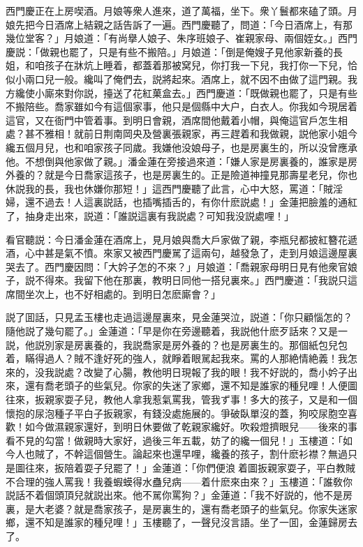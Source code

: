 西門慶正在上房喫酒。月娘等衆人進來，道了萬福，坐下。衆丫鬟都來磕了頭。月娘先把今日酒席上結親之話告訴了一遍。西門慶聽了，問道：「今日酒席上，有那幾位堂客？」月娘道：「有尚擧人娘子、朱序班娘子、崔親家母、兩個姪女。」西門慶説：「做親也罷了，只是有些不搬陪。」月娘道：「倒是俺嫂子見他家新養的長姐，和咱孩子在牀炕上睡着，都蓋着那被窝兒，你打我一下兒，我打你一下兒，恰似小兩口兒一般。纔叫了俺們去，説將起來。酒席上，就不因不由做了這門親。我方纔使小廝來對你説，擡送了花紅菓盒去。」西門慶道：「既做親也罷了，只是有些不搬陪些。喬家雖如今有這個家事，他只是個縣中大户，白衣人。你我如今現居着這官，又在衙門中管着事。到明日會親，酒席間他戴着小帽，與俺這官戶怎生相處？甚不雅相！就前日荆南岡央及營裏張親家，再三趕着和我做親，説他家小姐今纔五個月兒，也和咱家孩子同歲。我嫌他没娘母子，也是房裏生的，所以没曾應承他。不想倒與他家做了親。」潘金蓮在旁接過來道：「嫌人家是房裏養的，誰家是房外養的？就是今日喬家這孩子，也是房裏生的。正是險道神撞見那壽星老兒，你也休説我的長，我也休嫌你那短！」這西門慶聽了此言，心中大怒，罵道：「賊淫婦，還不過去！人這裏説話，也插嘴插舌的，有你什麽説處！」金蓮把臉羞的通紅了，抽身走出來，説道：「誰説這裏有我説處？可知我没説處哩！」

看官聽説：今日潘金蓮在酒席上，見月娘與喬大戶家做了親，李瓶兒都披紅簪花遞酒，心中甚是氣不憤。來家又被西門慶駡了這兩句，越發急了，走到月娘這邊屋裏哭去了。西門慶因問：「大妗子怎的不來？」月娘道：「喬親家母明日見有他衆官娘子，説不得來。我留下他在那裏，教明日同他一搭兒裏來。」西門慶道：「我説只這席間坐次上，也不好相處的。到明日怎麽廝會？」

説了囬話，只見孟玉樓也走過這邊屋裏來，見金蓮哭泣，説道：「你只顧惱怎的？隨他説了幾句罷了。」金蓮道：「早是你在旁邊聽着，我説他什麽歹話來？又是一説，他説別家是房裏養的，我説喬家是房外養的？也是房裏生的。那個紙包兒包着，瞞得過人？賊不逢好死的強人，就睜着眼駡起我來。罵的人那絶情絶義！我怎來的，没我説處？改變了心腸，教他明日現報了我的眼！我不好説的，喬小妗子出來，還有喬老頭子的些氣兒。你家的失迷了家鄉，還不知是誰家的種兒哩！人便圖往來，扳親家耍子兒，教他人拿我惹氣罵我，管我ず事！多大的孩子，又是和一個懷抱的尿泡種子平白子扳親家，有錢没處施展的。爭破臥單沒的蓋，狗咬尿胞空喜歡！如今做濕親家還好，到明日休要做了乾親家纔好。吹殺燈擠眼兒——後來的事看不見的勾當！做親時大家好，過後三年五載，妨了的纔一個兒！」玉樓道：「如今人也賊了，不幹這個營生。論起來也還早哩，纔養的孩子，割什麽衫襟？無過只是圖往來，扳陪着耍子兒罷了！」金蓮道：「你們便浪𢵞着圖扳親家耍子，平白教賊不合理的強人罵我！我養蝦蟆得水蠱兒病——着什麽來由來？」玉樓道：「誰敎你説話不着個頭頂兒就説出來。他不駡你罵狗？」金蓮道：「我不好説的，他不是房裏，是大老婆？就是喬家孩子，是房裏生的，還有喬老頭子的些氣兒。你家失迷家鄉，還不知是誰家的種兒哩！」玉樓聽了，一聲兒沒言語。坐了一囬，金蓮歸房去了。

